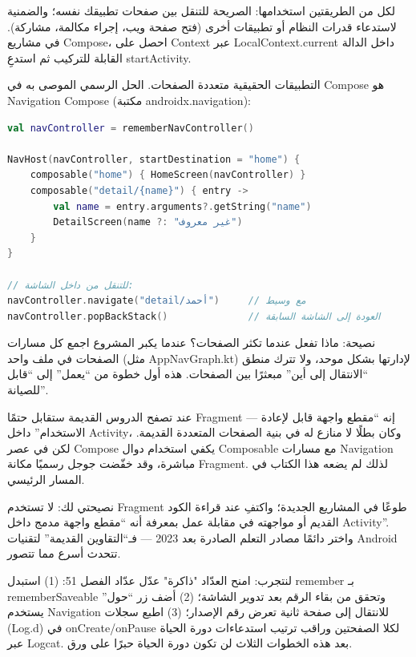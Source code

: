لكل من الطريقتين استخدامها: الصريحة للتنقل بين صفحات تطبيقك نفسه؛ والضمنية لاستدعاء قدرات النظام أو تطبيقات أخرى (فتح صفحة ويب، إجراء مكالمة، مشاركة). في مشاريع Compose، احصل على Context عبر LocalContext.current داخل الدالة القابلة للتركيب ثم استدعِ startActivity.


التطبيقات الحقيقية متعددة الصفحات. الحل الرسمي الموصى به في Compose هو Navigation Compose (مكتبة androidx.navigation):

\begin{lstlisting}[language=Kotlin]
val navController = rememberNavController()

NavHost(navController, startDestination = "home") {
    composable("home") { HomeScreen(navController) }
    composable("detail/{name}") { entry ->
        val name = entry.arguments?.getString("name")
        DetailScreen(name ?: "غير معروف")
    }
}

// للتنقل من داخل الشاشة:
navController.navigate("detail/أحمد")     // مع وسيط
navController.popBackStack()              // العودة إلى الشاشة السابقة
\end{lstlisting}

\begin{tcbinfo}{نصيحة: ماذا تفعل عندما تكثر الصفحات؟}
عندما يكبر المشروع اجمع كل مسارات الصفحات في ملف واحد (مثل AppNavGraph.kt) لإدارتها بشكل موحد، ولا تترك منطق “الانتقال إلى أين” مبعثرًا بين الصفحات. هذه أول خطوة من “يعمل” إلى “قابل للصيانة”.

\end{tcbinfo}


عند تصفح الدروس القديمة ستقابل حتمًا Fragment — إنه “مقطع واجهة قابل لإعادة الاستخدام” داخل Activity، وكان بطلًا لا منازع له في بنية الصفحات المتعددة القديمة. لكن في عصر Compose يكفي استخدام دوال Composable مع مسارات Navigation مباشرة، وقد خفّضت جوجل رسميًا مكانة Fragment. لذلك لم يضعه هذا الكتاب في المسار الرئيسي.

نصيحتي لك: لا تستخدم Fragment طوعًا في المشاريع الجديدة؛ واكتفِ عند قراءة الكود القديم أو مواجهته في مقابلة عمل بمعرفة أنه “مقطع واجهة مدمج داخل Activity”. واختر دائمًا مصادر التعلم الصادرة بعد 2023 — فـ“التقاوين القديمة” لتقنيات Android تتحدث أسرع مما تتصور.

\begin{tcbpractice}{لنتجرب: امنح العدّاد "ذاكرة"}
عدّل عدّاد الفصل 51: (1) استبدل remember بـ rememberSaveable وتحقق من بقاء الرقم بعد تدوير الشاشة؛ (2) أضف زر “حول” يستخدم Navigation للانتقال إلى صفحة ثانية تعرض رقم الإصدار؛ (3) اطبع سجلات (Log.d) في onCreate/onPause لكلا الصفحتين وراقب ترتيب استدعاءات دورة الحياة عبر Logcat. بعد هذه الخطوات الثلاث لن تكون دورة الحياة حبرًا على ورق.

\end{tcbpractice}

